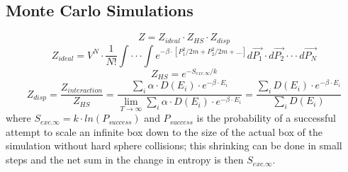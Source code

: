 \subsection{Monte Carlo Simulations}
$$Z=Z_{ideal}\cdot Z_{HS}\cdot Z_{disp}$$
$$Z_{ideal}=V^N\cdot\frac{1}{N!}\int\cdot\cdot\cdot\int e^{-\beta\cdot [P_{1}^2/{2m}+P_{2}^2/{2m}+...]}d\vec{P_1}\cdot d\vec{P_2}\cdot\cdot\cdot d\vec{P_N}$$
$$Z_{HS}=e^{-S_{exc.\infty}/k}$$
$$Z_{disp}=\frac{Z_{interaction}}{Z_{HS}}=\frac{\sum_i \alpha\cdot D(E_i)\cdot e^{-\beta\cdot E_i}}{\lim_{T\to\infty}\sum_i \alpha\cdot D(E_i)\cdot e^{-\beta\cdot E_i}}=\frac{\sum_i D(E_i)\cdot e^{-\beta\cdot E_i}}{\sum_i D(E_i)}$$
where $S_{exc.\infty}=k\cdot ln(P_{success})$ and $P_{success}$ is the probability of a successful attempt to scale an infinite box down to the size of the actual box of the simulation without hard sphere collisions; this shrinking can be done in small steps and the net sum in the change in entropy is then $S_{exc.\infty}$.

